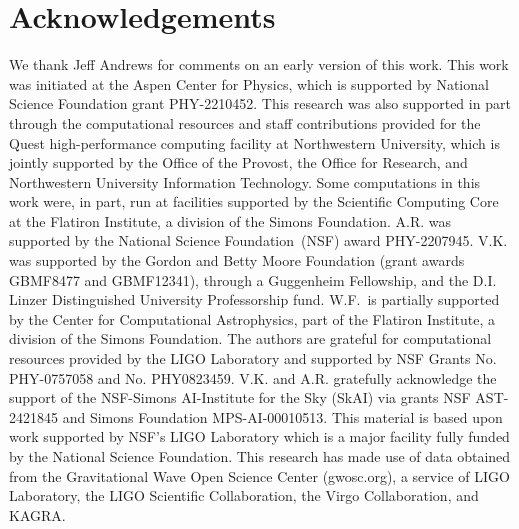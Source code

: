 \documentclass[modern]{aastex631}
\begin{document}
\section{Acknowledgements}
\begin{acknowledgments}
    We thank Jeff Andrews for comments on an early version of this work. This work was initiated at the Aspen Center for Physics, which is supported by National Science Foundation grant PHY-2210452. This
research was also supported in part through the computational resources and
staff contributions provided for the Quest high-performance computing facility
at Northwestern University, which is jointly supported by the Office of the
Provost, the Office for Research, and Northwestern University Information
Technology.   Some computations in this work were, in part, run at facilities
supported by the Scientific Computing Core at the Flatiron Institute, a division
of the Simons Foundation.  A.R. was supported by the National Science
Foundation~(NSF) award PHY-2207945. V.K. was supported by the Gordon and Betty
Moore Foundation (grant awards GBMF8477 and GBMF12341), through a Guggenheim
Fellowship, and the D.I. Linzer Distinguished University Professorship fund.
W.F.~is partially supported by the Center for Computational Astrophysics, part
of the Flatiron Institute, a division of the Simons Foundation.  The authors are
grateful for computational resources provided by the LIGO Laboratory and
supported by NSF Grants No. PHY-0757058 and No. PHY0823459. V.K. and A.R.
gratefully acknowledge the support of the NSF-Simons AI-Institute for the Sky
(SkAI) via grants NSF AST-2421845 and Simons Foundation MPS-AI-00010513. This
material is based upon work supported by NSF’s LIGO Laboratory which is a major
facility fully funded by the National Science Foundation. This research has made
use of data obtained from the Gravitational Wave Open Science Center
(gwosc.org), a service of LIGO Laboratory, the LIGO Scientific Collaboration,
the Virgo Collaboration, and KAGRA. 
\end{acknowledgments}


\clearpage


\end{document}
